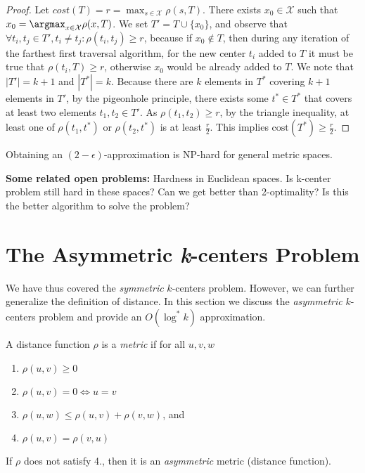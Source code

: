 \begin{proof}
Let $ cost(T) = r = \max_{s \in \mathcal{X}} \rho(s,T) $. There exists
$x_0 \in \mathcal{X}$ such that $x_0 = \argmax_{x \in\mathcal{X}}
\rho(x,T)$. We set $T' = T \cup \{x_0\} $, and observe that $\forall
t_i, t_j \in T', t_i \ne t_j : \rho(t_i,t_j) \ge r$, because if $x_0
\notin T$, then during any iteration of the farthest first traversal
algorithm, for the new center $t_i$ added to $T$ it must be true that
$\rho(t_i, T) \geq r$, otherwise $x_0$ would be already added to $T$.
We note that $|T'| = k+1$ and $ |T^*| = k$. Because there are $k$
elements in $T^*$ covering $k+1$ elements in $T'$, by the pigeonhole
principle, there exists some $t^* \in T^*$ that covers at least two
elements $t_1,t_2 \in T'$. As $\rho(t_1,t_2) \geq r$, by the triangle
inequality, at least one of $\rho(t_1,t^*)$ or $\rho(t_2,t^*)$ is at
least $\frac{r}{2}$. This implies $\mathrm{cost}(T^*)\geq\frac{r}{2}$.
\end{proof}

\begin{remark}
Obtaining an $(2 - \epsilon)$-approximation is NP-hard for general
metric spaces.
\end{remark}

\noindent\textbf{Some related open problems:} Hardness in Euclidean
spaces. Is k-center problem still hard in these spaces? Can we get
better than 2-optimality? Is this the better algorithm to solve the
problem? 


\section{The Asymmetric \emph{k}-centers Problem}

We have thus covered the \emph{symmetric} $k$-centers problem. However, we can further generalize the definition of distance. In this section we discuss the \emph{asymmetric} $k$-centers problem and provide an $O(\log^*k)$ approximation.\cite{Archer2001}

\begin{definition}
A distance function $\rho$ is a \emph{metric} if for all $u,v,w$
\begin{enumerate}
    \item $\rho(u,v)\geq0$
    \item $\rho(u,v)=0\iff u=v$
    \item $\rho(u,w)\leq\rho(u,v)+\rho(v,w)$, and
    \item $\rho(u,v)=\rho(v,u)$
\end{enumerate}
If $\rho$ does not satisfy 4., then it is an \emph{asymmetric} metric (distance function).
\end{definition}

